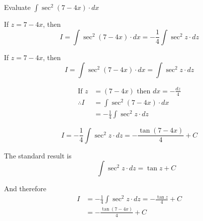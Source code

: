 \documentclass[14pt,fleqn]{extarticle}
\begin{document}
\newcommand\ea{ \left( 7-4x\right)}
Evaluate $\int \sec^2 \left(7-4x \right)\cdot dx$ 

\newcard 

If $z = 7-4x$, then 
\[ I = \int \sec^2 \ea\cdot dx = -\frac{1}{4}\int \sec^2 z\cdot dz \]
%
\newcard 

If $z = 7-4x$, then 
\[ I = \int \sec^2 \ea\cdot dx = \int \sec^2 z\cdot dz \]

\newcard 

\begin{align}
	\text{If } z &= \ea\text{ then } dx = -\frac{dz}{4} \\
	\therefore I &= \int \sec^2 \ea\cdot dx \\
	&= -\frac{1}{4}\int \sec^2 z \cdot dz 
\end{align}

\newcard 

\[ I = -\frac{1}{4}\int\sec^2 z\cdot dz = -\frac{\tan \ea}{4} + C \]

\newcard 

The standard result is \[\qquad \int \sec^2 z\cdot dz = \tan z + C\]

And therefore 
\begin{align}
	I &= -\frac{1}{4}\int \sec^2 z\cdot dz = -\frac{\tan z}{4} + C \\ 
	&= -\frac{\tan \ea}{4} + C 
\end{align}
\end{document}
